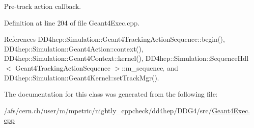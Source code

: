 Pre-\/track action callback. 

Definition at line 204 of file Geant4Exec.cpp.

References DD4hep::Simulation::Geant4TrackingActionSequence::begin(), DD4hep::Simulation::Geant4Action::context(), DD4hep::Simulation::Geant4Context::kernel(), DD4hep::Simulation::SequenceHdl$<$ Geant4TrackingActionSequence $>$::m\_\-sequence, and DD4hep::Simulation::Geant4Kernel::setTrackMgr().

The documentation for this class was generated from the following file:\begin{DoxyCompactItemize}
\item 
/afs/cern.ch/user/m/mpetric/nightly\_\-cppcheck/dd4hep/DDG4/src/\hyperlink{_geant4_exec_8cpp}{Geant4Exec.cpp}\end{DoxyCompactItemize}

